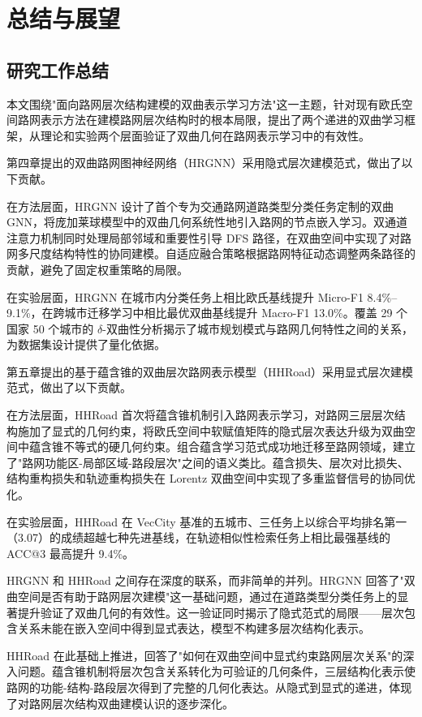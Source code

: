 \chapter{总结与展望}

\section{研究工作总结}

本文围绕"面向路网层次结构建模的双曲表示学习方法"这一主题，针对现有欧氏空间路网表示方法在建模路网层次结构时的根本局限，提出了两个递进的双曲学习框架，从理论和实验两个层面验证了双曲几何在路网表示学习中的有效性。

第四章提出的双曲路网图神经网络（HRGNN）采用隐式层次建模范式，做出了以下贡献。

在方法层面，HRGNN 设计了首个专为交通路网道路类型分类任务定制的双曲 GNN，将庞加莱球模型中的双曲几何系统性地引入路网的节点嵌入学习。双通道注意力机制同时处理局部邻域和重要性引导 DFS 路径，在双曲空间中实现了对路网多尺度结构特性的协同建模。自适应融合策略根据路网特征动态调整两条路径的贡献，避免了固定权重策略的局限。

在实验层面，HRGNN 在城市内分类任务上相比欧氏基线提升 Micro-F1 8.4\%--9.1\%，在跨城市迁移学习中相比最优双曲基线提升 Macro-F1 13.0\%。覆盖 29 个国家 50 个城市的 $\delta$-双曲性分析揭示了城市规划模式与路网几何特性之间的关系，为数据集设计提供了量化依据。

第五章提出的基于蕴含锥的双曲层次路网表示模型（HHRoad）采用显式层次建模范式，做出了以下贡献。

在方法层面，HHRoad 首次将蕴含锥机制引入路网表示学习，对路网三层层次结构施加了显式的几何约束，将欧氏空间中软赋值矩阵的隐式层次表达升级为双曲空间中蕴含锥不等式的硬几何约束。组合蕴含学习范式成功地迁移至路网领域，建立了"路网功能区-局部区域-路段层次"之间的语义类比。蕴含损失、层次对比损失、结构重构损失和轨迹重构损失在 Lorentz 双曲空间中实现了多重监督信号的协同优化。

在实验层面，HHRoad 在 VecCity 基准的五城市、三任务上以综合平均排名第一（3.07）的成绩超越七种先进基线，在轨迹相似性检索任务上相比最强基线的 ACC@3 最高提升 9.4\%。

HRGNN 和 HHRoad 之间存在深度的联系，而非简单的并列。HRGNN 回答了"双曲空间是否有助于路网层次建模"这一基础问题，通过在道路类型分类任务上的显著提升验证了双曲几何的有效性。这一验证同时揭示了隐式范式的局限——层次包含关系未能在嵌入空间中得到显式表达，模型不构建多层次结构化表示。

HHRoad 在此基础上推进，回答了"如何在双曲空间中显式约束路网层次关系"的深入问题。蕴含锥机制将层次包含关系转化为可验证的几何条件，三层结构化表示使路网的功能-结构-路段层次得到了完整的几何化表达。从隐式到显式的递进，体现了对路网层次结构双曲建模认识的逐步深化。

